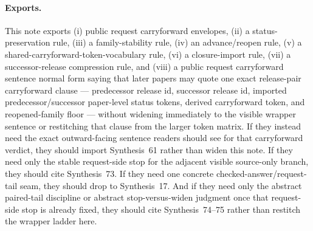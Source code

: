 \documentclass[11pt]{article}
\begin{document}
\paragraph{Exports.}
This note exports (i) public request carryforward envelopes, (ii) a status-preservation rule, (iii) a family-stability rule, (iv) an advance/reopen rule, (v) a shared-carryforward-token-vocabulary rule, (vi) a closure-import rule, (vii) a successor-release compression rule, and (viii) a public request carryforward sentence normal form saying that later papers may quote one exact release-pair carryforward clause --- predecessor release id, successor release id, imported predecessor/successor paper-level status tokens, derived carryforward token, and reopened-family floor --- without widening immediately to the visible wrapper sentence or restitching that clause from the larger token matrix. If they instead need the exact outward-facing sentence readers should see for that carryforward verdict, they should import Synthesis~61 rather than widen this note. If they need only the stable request-side stop for the adjacent visible source-only branch, they should cite Synthesis~73. If they need one concrete checked-answer/request-tail seam, they should drop to Synthesis~17. And if they need only the abstract paired-tail discipline or abstract stop-versus-widen judgment once that request-side stop is already fixed, they should cite Synthesis~74--75 rather than restitch the wrapper ladder here.
\end{document}
